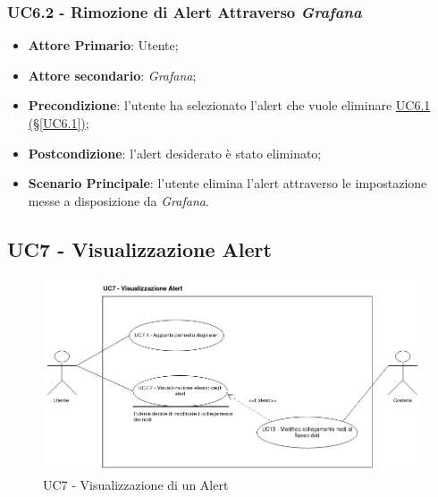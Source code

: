 \subsubsection{UC6.2 - Rimozione di Alert Attraverso \textit{Grafana}}\label{UC6.2}
\begin{itemize}
	\item \textbf{Attore Primario}: Utente;
	\item \textbf{Attore secondario}: \textit{Grafana};
	\item \textbf{Precondizione}:  l'utente ha selezionato l'alert che vuole eliminare \hyperref[UC6.1]{UC6.1 (§\ref*{UC6.1})};
	\item \textbf{Postcondizione}: l'alert desiderato è stato eliminato;
	\item \textbf{Scenario Principale}: l'utente elimina l'alert attraverso le impostazione messe a disposizione da \textit{Grafana}.
\end{itemize}

\pagebreak

\subsection{UC7 - Visualizzazione Alert}\label{UC7}

\begin{figure}[H]
	\centering
	\includegraphics[scale=0.5]{./images/UC7.png}
	\caption{UC7 - Visualizzazione di un Alert}
\end{figure}

